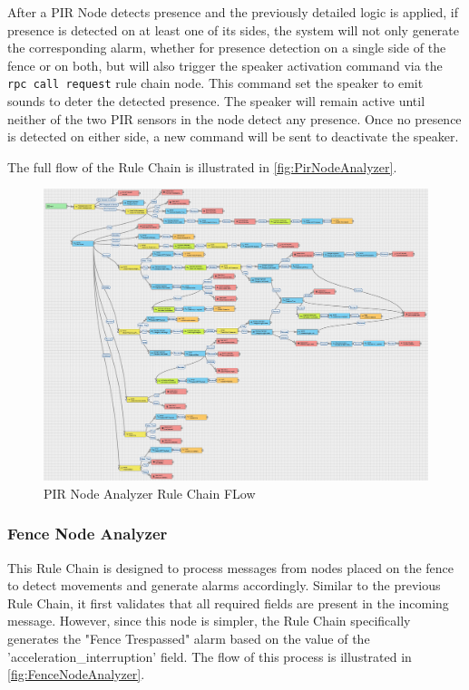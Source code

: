 After a PIR Node detects presence and the previously detailed logic is applied, if presence is detected on at least one of its sides, the system will not only generate the 
corresponding alarm, whether for presence detection on a single side of the fence or on both, but will also trigger the speaker activation command via the \texttt{rpc call request}
rule chain node. This command set the speaker to emit sounds to deter the detected presence. The speaker will remain active until neither of the two PIR sensors in the node 
detect any presence. Once no presence is detected on either side, a new command will be sent to deactivate the speaker.

The full flow of the Rule Chain is illustrated in \autoref{fig:PirNodeAnalyzer}.

\begin{figure}[H]
    \centering
    \includegraphics[width=1.4\textwidth,angle=90]{./images/8/PirNodeAnalyzer.PNG}
    \caption{PIR Node Analyzer Rule Chain FLow}
    \label{fig:PirNodeAnalyzer}
\end{figure}

\subsubsection*{Fence Node Analyzer}
This Rule Chain is designed to process messages from nodes placed on the fence to detect movements and generate alarms accordingly.  
Similar to the previous Rule Chain, it first validates that all required fields are present in the incoming message. However, since this node is simpler, the Rule 
Chain specifically generates the "Fence Trespassed" alarm based on the value of the 'acceleration\_interruption' field. The flow of this process is illustrated in \autoref{fig:FenceNodeAnalyzer}.

